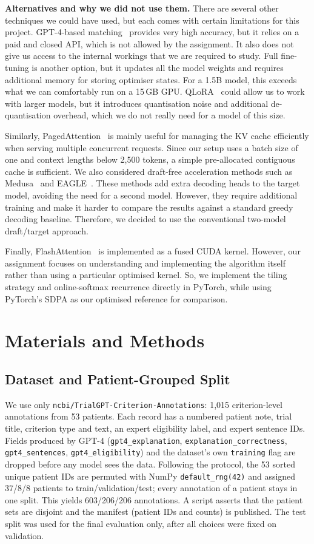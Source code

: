 \documentclass[conference]{IEEEtran}
\begin{document}
\textbf{Alternatives and why we did not use them.} There are several other techniques we could have used, but each comes with certain limitations for this project. GPT-4-based matching~\cite{trialgpt} provides very high accuracy, but it relies on a paid and closed API, which is not allowed by the assignment. It also does not give us access to the internal workings that we are required to study. Full fine-tuning is another option, but it updates all the model weights and requires additional memory for storing optimiser states. For a 1.5B model, this exceeds what we can comfortably run on a 15\,GB GPU. QLoRA~\cite{qlora} could allow us to work with larger models, but it introduces quantisation noise and additional de-quantisation overhead, which we do not really need for a model of this size.

Similarly, PagedAttention~\cite{vllm} is mainly useful for managing the KV cache efficiently when serving multiple concurrent requests. Since our setup uses a batch size of one and context lengths below 2,500 tokens, a simple pre-allocated contiguous cache is sufficient. We also considered draft-free acceleration methods such as Medusa~\cite{medusa} and EAGLE~\cite{eagle}. These methods add extra decoding heads to the target model, avoiding the need for a second model. However, they require additional training and make it harder to compare the results against a standard greedy decoding baseline. Therefore, we decided to use the conventional two-model draft/target approach.

Finally, FlashAttention~\cite{flash} is implemented as a fused CUDA kernel. However, our assignment focuses on understanding and implementing the algorithm itself rather than using a particular optimised kernel. So, we implement the tiling strategy and online-softmax recurrence directly in PyTorch, while using PyTorch's SDPA as our optimised reference for comparison.

\section{Materials and Methods}
\subsection{Dataset and Patient-Grouped Split}
We use only \texttt{ncbi/TrialGPT-Criterion-Annotations}: 1,015 criterion-level annotations from 53 patients. Each record has a numbered patient note, trial title, criterion type and text, an expert eligibility label, and expert sentence IDs. Fields produced by GPT-4 (\texttt{gpt4\_explanation}, \texttt{explanation\_correctness}, \texttt{gpt4\_sentences}, \texttt{gpt4\_eligibility}) and the dataset's own \texttt{training} flag are dropped before any model sees the data. Following the protocol, the 53 sorted unique patient IDs are permuted with NumPy \texttt{default\_rng(42)} and assigned 37/8/8 patients to train/validation/test; every annotation of a patient stays in one split. This yields 603/206/206 annotations. A script asserts that the patient sets are disjoint and the manifest (patient IDs and counts) is published. The test split was used for the final evaluation only, after all choices were fixed on validation.
\end{document}
